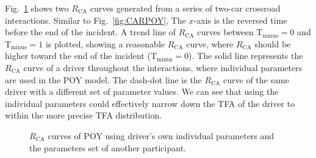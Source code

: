 
Fig.~\ref{fig:CAR_twoParticipants} shows two $R_{\mathrm{CA}}$ curves generated from a series of two-car crossroad interactions. Similar to Fig.~\ref{fig:CARPOY}, The $x$-axis is the reversed time before the end of the incident. A trend line of $R_{\mathrm{CA}}$ curves between $\mathrm{T}_{\mathrm{minus}} = 0$ and $\mathrm{T}_{\mathrm{minus}} = 1$ is plotted, showing a reasonable $R_{\mathrm{CA}}$ curve, where $R_{\mathrm{CA}}$ should be higher toward the end of the incident ($\mathrm{T}_{\mathrm{minus}} = 0$). The solid line represents the $R_{\mathrm{CA}}$ curve of a driver throughout the interactions, where individual parameters are used in the POY model. The dash-dot line is the $R_{\mathrm{CA}}$ curve of the same driver with a different set of parameter values. We can see that using the individual parameters could effectively narrow down the TFA of the driver to within the more precise TFA distribution.


\begin{figure}[htbp!]
\begin{center}
\end{center}
\caption{$R_{\mathrm{CA}}$ curves of POY using driver's own individual parameters and the parameters set of another participant.}
\label{fig:CAR_twoParticipants} 
\end{figure}


